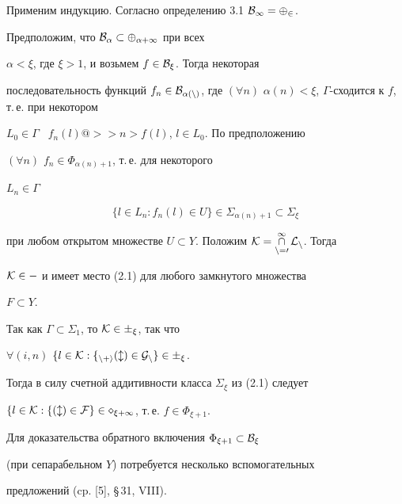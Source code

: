  


\begin{pf} 


Применим индукцию. Согласно определению 3.1 $\cal B_1=\Phi_2$. 


Предположим, что $\cal B_\alpha\subset \Phi_{\alpha+1}$ при всех 


$\alpha<\xi$, где $\xi>1$, и возьмем $f\in\cal B_\xi$. Тогда некоторая 


последовательность функций $f_n\in\cal B_{\alpha(n)}$, где $(\forall 


n)$ $\alpha(n)<\xi$, $\Gamma$-сходится к $f$, т.\,е. при некотором 


$L_0\in\Gamma$ \ $f_n(l)@>>n> f(l)$, $l\in L_0$. По предположению 


$(\forall n)$ $f_n\in\Phi_{\alpha(n)+1}$, т.\,е. для некоторого 


$L_n\in\Gamma$ 


$$ 


\{l\in L_n:f_n(l)\in U\}\in\Sigma_{\alpha(n)+1}\subset \Sigma_\xi 


$$ 


при любом открытом множестве $U\subset Y$. Положим $\cal K= 


\mycap^\infty_{n=0}L_n$. Тогда 


$\cal K\in\Gamma$ и имеет место (2.1) для любого замкнутого множества 


$F\subset Y$. 


Так как $\Gamma\subset\Sigma_1$, то $\cal K\in\Sigma_\xi$, так что 


$\forall(i,n)$ $\{l\in\cal K:f_{n+i}(l)\in G_n\}\in \Sigma_\xi$. 


Тогда в силу счетной аддитивности класса $\Sigma_\xi$ из (2.1) следует 


$\{l\in\cal K:f(l)\in F\}\in\Pi_{\xi+1}$, т.\,е. $f\in\Phi_{\xi+1}$. 


\end{pf} 


 


Для доказательства обратного включения $\Phi_{\xi+1}\subset \cal B_\xi$ 


(при сепарабельном $Y$) потребуется несколько вспомогательных 


предложений (cp. [5], \S\,31, VIII). 


 


